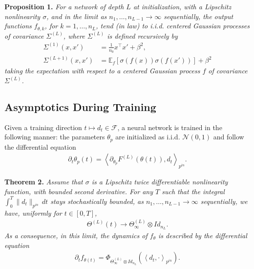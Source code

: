\documentclass[10pt]{article}
\newcommand{\EE}{\mathbb{E}}
\newcommand{\FF}{\mathcal{F}}
\newcommand{\NN}{\mathcal{N}}
\newcommand{\inner}[2]{\left\langle #1, #2 \right\rangle}
\newcommand{\paran}[1]{{( #1 )}}
\newcommand{\pin}{{p^{in}}}
\begin{document}
\textbf{Proposition 1.} \textit{For a network of depth $L$ at initialization, with a Lipschitz nonlinearity $\sigma$, and in the limit as $n_1, \ldots, n_{L - 1} \rightarrow \infty$ sequentially, the output functions $f_{\theta,k}$, for $k = 1, \ldots, n_L$, tend (in law) to i.i.d. centered Gaussian processes of covariance $\Sigma^\paran{L}$, where $\Sigma^\paran{L}$ is defined recursively by
\begin{align*}
\Sigma^\paran{1}(x,x') &= \frac{1}{n_0} x^\top x' + \beta^2, \\
\Sigma^\paran{L + 1}(x,x') &= \EE_f [\sigma(f(x)) \sigma(f(x'))] + \beta^2
\end{align*}
taking the expectation with respect to a centered Gaussian process $f$ of covariance $\Sigma^\paran{L}$.}

\subsection{Asymptotics During Training}

Given a training direction $t \mapsto d_t \in \FF$, a neural network is trained in the following manner: the parameters $\theta_p$ are initialized as i.i.d. $\NN(0,1)$ and follow the differential equation
\begin{align*}
\partial_t \theta_p(t) = \inner{\partial_{\theta_p} F^\paran{L}(\theta(t))}{d_t}_\pin.
\end{align*}

\textbf{Theorem 2.} \textit{Assume that $\sigma$ is a Lipschitz twice differentiable nonlinearity function, with bounded second derivative. For any $T$ such that the integral $\int_0^T \|d_t\|_\pin \, dt$ stays stochastically bounded, as $n_1, \ldots, n_{L - 1} \rightarrow \infty$ sequentially, we have, uniformly for $t \in [0,T]$,
\begin{align*}
\Theta^\paran{L}(t) \rightarrow \Theta^\paran{L}_\infty \otimes Id_{n_L}.
\end{align*}
As a consequence, in this limit, the dynamics of $f_\theta$ is described by the differential equation
\begin{align*}
\partial_t f_{\theta(t)} = \Phi_{\Theta^\paran{L}_\infty \otimes Id_{n_L}} \left( \inner{d_t}{\cdot}_\pin \right).
\end{align*}}
\end{document}
